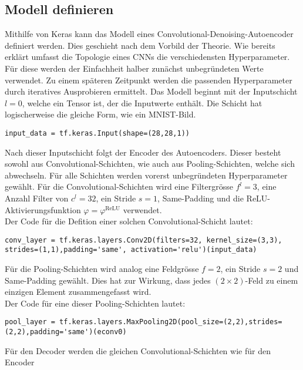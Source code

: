 \subsection{Modell definieren}
Mithilfe von Keras kann das Modell eines Convolutional-Denoising-Autoencoder
definiert werden. Dies geschieht nach dem Vorbild der Theorie.
Wie bereits erklärt umfasst die Topologie eines CNNs die verschiedensten Hyperparameter.
Für diese werden der Einfachheit halber zunächst unbegründeten Werte verwendet.
Zu einem späteren Zeitpunkt werden die passenden Hyperparameter durch iteratives Ausprobieren ermittelt.
\para{}
Das Modell beginnt mit der Inputschicht $l=0$, welche ein Tensor ist, der
die Inputwerte enthält. Die Schicht hat logischerweise die gleiche Form, wie ein MNIST-Bild.
\begin{verbatim}
input_data = tf.keras.Input(shape=(28,28,1))
\end{verbatim}
\para{}
Nach dieser Inputschicht folgt der Encoder des Autoencoders. Dieser besteht
sowohl aus Convolutional-Schichten, wie auch aus Pooling-Schichten, welche sich abwechseln.
Für alle Schichten werden vorerst unbegründeten Hyperparameter gewählt.
Für die Convolutional-Schichten wird
eine Filtergrösse $f^l = 3$, eine Anzahl Filter von $c^l = 32$,
ein Stride $s=1$, Same-Padding und die ReLU-Aktivierungsfunktion $\varphi =
\varphi^{\text{ReLU}}$ verwendet. \\
Der Code für die Defition einer solchen Convolutional-Schicht lautet:
\begin{verbatim}
conv_layer = tf.keras.layers.Conv2D(filters=32, kernel_size=(3,3),
strides=(1,1),padding='same', activation='relu')(input_data)
\end{verbatim}
Für die Pooling-Schichten wird analog eine Feldgrösse $f = 2$, ein
Stride $s = 2$ und Same-Padding gewählt. Dies hat zur Wirkung, dass jedes $(2
\times 2)$-Feld zu einem einzigen Element zusammengefasst wird. \\
Der Code für eine dieser Pooling-Schichten lautet:
\begin{verbatim}
pool_layer = tf.keras.layers.MaxPooling2D(pool_size=(2,2),strides=(2,2),padding='same')(econv0)
\end{verbatim}
Für den Decoder werden die gleichen Convolutional-Schichten wie für den Encoder
